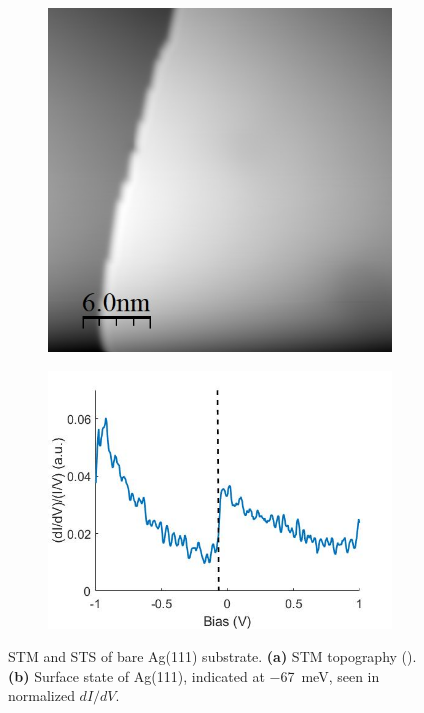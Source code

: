 \begin{figure} [h]
    \centering
    \begin{subfigure}[t]{0.44\textwidth}
    \includegraphics[width=\textwidth]{pictures/ag111_1V_10pA.jpg}
    \caption{}
    \end{subfigure}
    \hfill
    \begin{subfigure}[t]{0.53\textwidth}
        \includegraphics[width=\textwidth]{pictures/ag111_surface_state.jpg}
        \caption{}

    \end{subfigure}
    
    \caption{STM and STS of bare Ag(111) substrate. \textbf{(a)} STM topography (). \textbf{(b)} Surface state of Ag(111), indicated at \SI{-67}{meV}, seen in normalized $dI/dV$.}
    
    \label{fig:expsetup:Ag111}
\end{figure}


